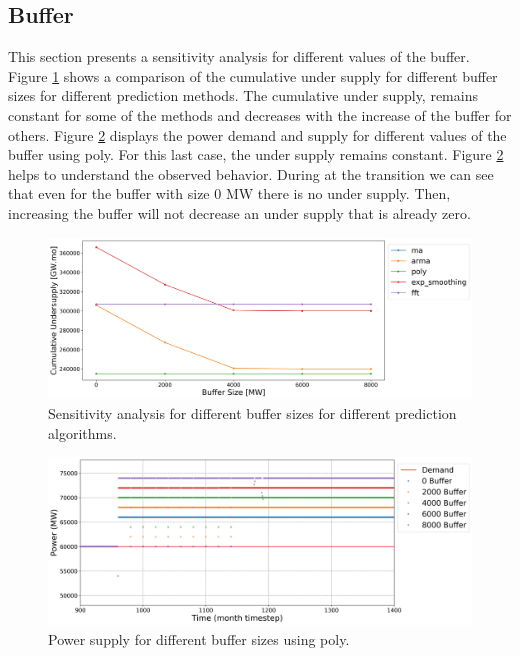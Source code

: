 \documentclass[11pt]{article}
\begin{document}
\subsection{Buffer}

This section presents a sensitivity analysis for different values of the buffer. Figure \ref{fig:23-buff} shows a comparison of the cumulative under supply for different buffer sizes for different prediction methods. The cumulative under supply, remains constant for some of the methods and decreases with the increase of the buffer for others. Figure \ref{fig:23-buf-poly} displays the power demand and supply for different values of the buffer using poly. For this last case, the under supply remains constant. Figure \ref{fig:23-buf-poly} helps to understand the observed behavior. During at the transition we can see that even for the buffer with size 0 MW there is no under supply. Then, increasing the buffer will not decrease an under supply that is already zero.

\begin{figure}[H]
	\centering
	\includegraphics[width=\textwidth]{23-figures/23-sens-buffer.png} 
	\hfill
	\caption{Sensitivity analysis for different buffer sizes for different prediction algorithms.}
	\label{fig:23-buff}
\end{figure}

\begin{figure}[H]
	\centering
	\includegraphics[width=\textwidth]{23-figures/23-power-buffer-poly.png} 
	\hfill
	\caption{Power supply for different buffer sizes using poly.}
	\label{fig:23-buf-poly}
\end{figure}
\end{document}
